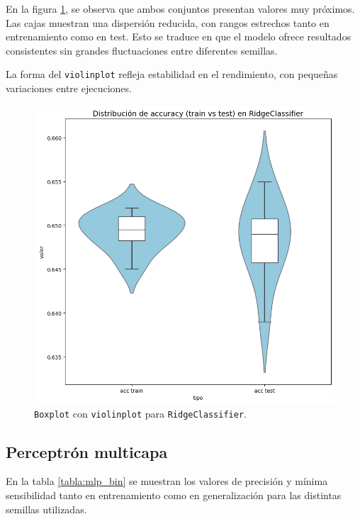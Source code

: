 En la figura \ref{fig:ridge_bin}, se observa que ambos conjuntos presentan valores muy próximos. Las cajas muestran una dispersión reducida, con rangos estrechos tanto en entrenamiento como en test. Esto se traduce en que el modelo ofrece resultados consistentes sin grandes fluctuaciones entre diferentes semillas.

\vspace{1em}

La forma del \texttt{violinplot} refleja estabilidad en el rendimiento, con pequeñas variaciones entre ejecuciones.

\begin{figure}[H]
	\centering
	\includegraphics[width=1\linewidth]{Imagenes/ridge_bin}
	\caption[\texttt{Boxplot} con \texttt{violinplot} para \texttt{RidgeClassifier}]{\texttt{Boxplot} con \texttt{violinplot} para \texttt{RidgeClassifier}.}
	\label{fig:ridge_bin}
\end{figure}

\newpage
\subsection{Perceptrón multicapa}
\label{subsec:mlp_bin}

En la tabla \ref{tabla:mlp_bin} se muestran los valores de precisión y mínima sensibilidad tanto en entrenamiento como en generalización para las distintas semillas utilizadas.

